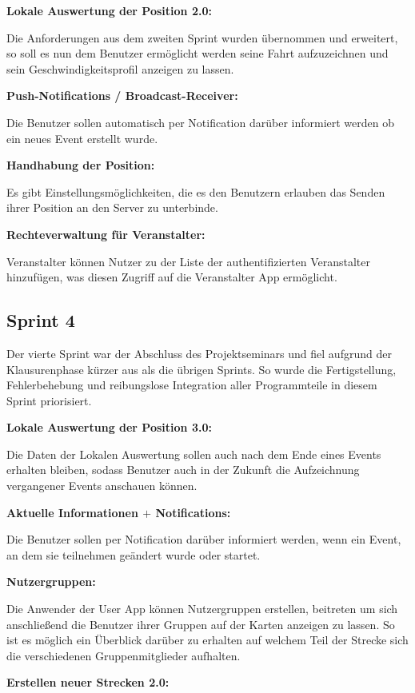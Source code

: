 \documentclass[a4paper, titlepage]{scrartcl}
\begin{document}
\textbf{Lokale Auswertung der Position 2.0:}

Die Anforderungen aus dem zweiten Sprint wurden übernommen und erweitert, so soll es nun dem Benutzer ermöglicht werden seine Fahrt aufzuzeichnen und sein Geschwindigkeitsprofil anzeigen zu lassen.

\textbf{Push-Notifications / Broadcast-Receiver:}

Die Benutzer sollen automatisch per Notification darüber informiert werden ob ein neues Event erstellt wurde.

\textbf{Handhabung der Position:}

Es gibt Einstellungsmöglichkeiten, die es den Benutzern erlauben das Senden ihrer Position an den Server zu unterbinde.

\textbf{Rechteverwaltung für Veranstalter:}

Veranstalter können Nutzer zu der Liste der authentifizierten Veranstalter hinzufügen, was diesen Zugriff auf die Veranstalter App ermöglicht.



\subsection{Sprint 4}
Der vierte Sprint war der Abschluss des Projektseminars und fiel aufgrund der Klausurenphase kürzer aus als die übrigen Sprints. So wurde die Fertigstellung, Fehlerbehebung und reibungslose Integration aller Programmteile in diesem Sprint priorisiert.

\textbf{Lokale Auswertung der Position 3.0:}

Die Daten der Lokalen Auswertung sollen auch nach dem Ende eines Events erhalten bleiben, sodass Benutzer auch in der Zukunft die Aufzeichnung vergangener Events anschauen können.

\textbf{Aktuelle Informationen $+$ Notifications:}

Die Benutzer sollen per Notification darüber informiert werden, wenn ein Event, an dem sie teilnehmen geändert wurde oder startet.

\textbf{Nutzergruppen:}

Die Anwender der User App können Nutzergruppen erstellen, beitreten um sich anschließend die Benutzer ihrer Gruppen auf der Karten anzeigen zu lassen. So ist es möglich ein Überblick darüber zu erhalten auf welchem Teil der Strecke sich die verschiedenen Gruppenmitglieder aufhalten. 

\textbf{Erstellen neuer Strecken 2.0:}
\end{document}
